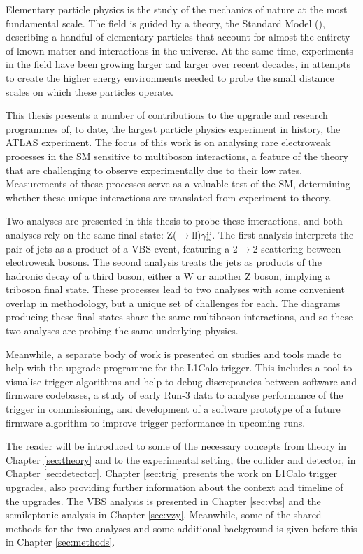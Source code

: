 Elementary particle physics is the study of the mechanics of nature at the most
fundamental scale. The field is guided by a theory, the Standard Model
(), describing a handful of elementary particles that account for almost
the entirety of known matter and interactions in the universe. At the same time,
experiments in the field have been growing larger and larger over recent
decades, in attempts to create the higher energy environments needed to probe
the small distance scales on which these particles operate.

This thesis presents a number of contributions to the upgrade and research
programmes of, to date, the largest particle physics experiment in history, the
\ac{ATLAS} experiment. The focus of this work is on analysing rare electroweak
processes in the \ac{SM} sensitive to multiboson interactions, a 
feature of the theory that are challenging to observe experimentally due to
their low rates. Measurements of these processes serve as a valuable
test of the \ac{SM}, determining whether these unique interactions are translated
from experiment to theory.

Two analyses are presented in this thesis to probe these interactions, and both
analyses rely on the same final state: Z($\to$ll)$\gamma$jj. The first analysis
interprets the pair of jets as a product of a \ac{VBS} event, featuring a
$2\to2$ scattering between electroweak bosons. The second analysis treats the
jets as products of the hadronic decay of a third boson, either a W or another Z
boson, implying a triboson final state. These processes lead to two analyses
with some convenient overlap in methodology, but a unique set of challenges for
each. The diagrams producing these final states share the same multiboson
interactions, and so these two analyses are probing the same underlying physics.

Meanwhile, a separate body of work is presented on studies and tools made to
help with the upgrade programme for the \ac{L1Calo} trigger. This includes a
tool to visualise trigger algorithms and help to debug discrepancies between
software and firmware codebases, a study of early Run-3 data to analyse
performance of the trigger in commissioning, and development of a software
prototype of a future firmware algorithm to improve trigger performance in
upcoming runs.

The reader will be introduced to some of the necessary concepts from theory in
Chapter \ref{sec:theory} and to the experimental setting, the collider and
detector, in Chapter \ref{sec:detector}. Chapter \ref{sec:trig} presents the
work on \ac{L1Calo} trigger upgrades, also providing further information about the
context and timeline of the upgrades. The \ac{VBS} \Zy analysis is presented in
Chapter \ref{sec:vbs} and the semileptonic \VZy analysis in Chapter
\ref{sec:vzy}.  Meanwhile, some of the shared methods for the two analyses and
some additional background is given before this in Chapter \ref{sec:methods}.

